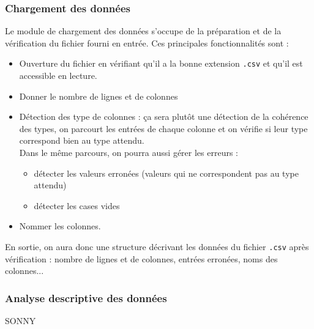 			\subsubsection{Chargement des données}
				Le module de chargement des données s'occupe de la préparation et de la vérification du fichier fourni en entrée. Ces principales fonctionnalités sont :
				\begin{itemize}
				\item Ouverture du fichier en vérifiant qu'il a la bonne extension \lstinline!.csv! et qu'il est accessible en lecture.
				\item Donner le nombre de lignes et de colonnes
				\item Détection des type de colonnes : ça sera plutôt une détection de la cohérence des types, on parcourt les entrées de chaque colonne et on vérifie si leur type correspond bien au type attendu.\\
				Dans le même parcours, on pourra aussi gérer les erreurs :
					\begin{itemize}
					\item détecter les valeurs erronées (valeurs qui ne correspondent pas au type attendu)
					\item détecter les cases vides
					\end{itemize}
				\item Nommer les colonnes.
				\end{itemize}
				En sortie, on aura donc une structure décrivant les données du fichier \lstinline!.csv! après vérification : nombre de lignes et de colonnes, entrées erronées, noms des colonnes...
				
			\subsubsection{Analyse descriptive des données}
				SONNY
			
